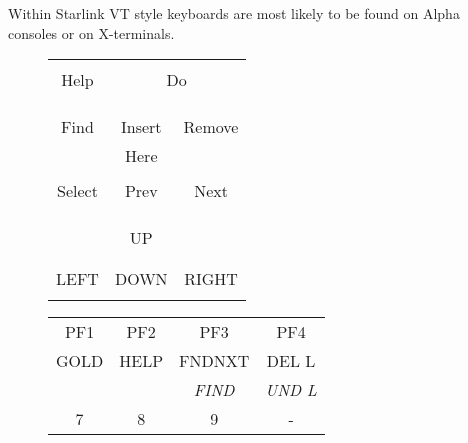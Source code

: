 \documentclass[twoside,11pt]{article}
\begin{document}
Within Starlink VT style keyboards are most likely to be found on Alpha
consoles or on X-terminals.
\begin{figure}[t]
\scriptsize
\begin{center}
\begin{tabular}{ccc} \hline
\multicolumn{1}{|c|}{}       & \multicolumn{2}{|c|}{}  \\
\multicolumn{1}{|c|}{Help}    & \multicolumn{2}{|c|}{Do} \\
\multicolumn{1}{|c|}{}       & \multicolumn{2}{|c|}{}  \\  \hline
         &              &        \\ \hline
\multicolumn{1}{|c|}{} & \multicolumn{1}{|c|}{} & \multicolumn{1}{|c|}{} \\
\multicolumn{1}{|c|}{{Find}}    &  \multicolumn{1}{|c|}{Insert} &
\multicolumn{1}{|c|}{Remove} \\
\multicolumn{1}{|c|}{} & \multicolumn{1}{|c|}{Here} & \multicolumn{1}{|c|}{} \\
\hline
\multicolumn{1}{|c|}{} & \multicolumn{1}{|c|}{} & \multicolumn{1}{|c|}{} \\
\multicolumn{1}{|c|}{Select}    &  \multicolumn{1}{|c|}{Prev} &
\multicolumn{1}{|c|}{Next} \\
\multicolumn{1}{|c|}{} & \multicolumn{1}{|c|}{} & \multicolumn{1}{|c|}{} \\
\hline
         &              &        \\ \cline{2-2}
        & \multicolumn{1}{|c|}{}  & \\
        & \multicolumn{1}{|c|}{UP}  & \\
        & \multicolumn{1}{|c|}{}  & \\ \hline
\multicolumn{1}{|c|}{} & \multicolumn{1}{|c|}{} & \multicolumn{1}{|c|}{} \\
\multicolumn{1}{|c|}{LEFT}    &  \multicolumn{1}{|c|}{DOWN} &
\multicolumn{1}{|c|}{RIGHT} \\
\multicolumn{1}{|c|}{} & \multicolumn{1}{|c|}{} & \multicolumn{1}{|c|}{} \\
\hline
\end{tabular}
\hspace{5mm}
\begin{tabular}{|c|c|c|c|} \hline
PF1      & PF2       & PF3     & PF4   \\
GOLD     & HELP      & FNDNXT  & DEL L \\
         &           & \textit{FIND}    & \textit{UND L} \\ \hline
7        & 8         & 9       & -     \\

\end{tabular}
\end{center}
\end{figure}
\end{document}
